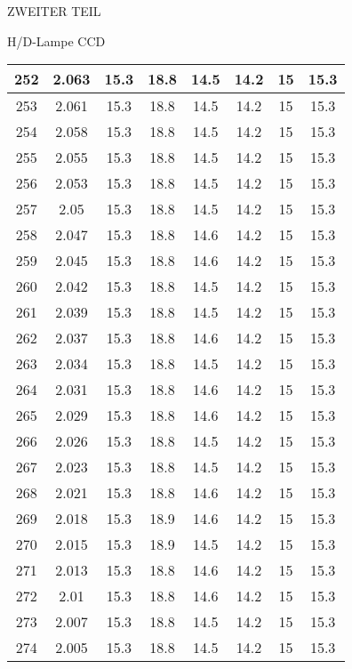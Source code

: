 \begin{appendix}
\begin{chapter}{ZWEITER TEIL}
\begin{section}{H/D-Lampe CCD}
\begin{scriptsize}
\begin{longtable}[htbp]{|c|c|c|c|c|c|c|c|}
            252 & 2.063 & 15.3 & 18.8 & 14.5 & 14.2 & 15 & 15.3 \\ \hline
            253 & 2.061 & 15.3 & 18.8 & 14.5 & 14.2 & 15 & 15.3 \\ \hline
            254 & 2.058 & 15.3 & 18.8 & 14.5 & 14.2 & 15 & 15.3 \\ \hline
            255 & 2.055 & 15.3 & 18.8 & 14.5 & 14.2 & 15 & 15.3 \\ \hline
            256 & 2.053 & 15.3 & 18.8 & 14.5 & 14.2 & 15 & 15.3 \\ \hline
            257 & 2.05 & 15.3 & 18.8 & 14.5 & 14.2 & 15 & 15.3 \\ \hline
            258 & 2.047 & 15.3 & 18.8 & 14.6 & 14.2 & 15 & 15.3 \\ \hline
            259 & 2.045 & 15.3 & 18.8 & 14.6 & 14.2 & 15 & 15.3 \\ \hline
            260 & 2.042 & 15.3 & 18.8 & 14.5 & 14.2 & 15 & 15.3 \\ \hline
            261 & 2.039 & 15.3 & 18.8 & 14.5 & 14.2 & 15 & 15.3 \\ \hline
            262 & 2.037 & 15.3 & 18.8 & 14.6 & 14.2 & 15 & 15.3 \\ \hline
            263 & 2.034 & 15.3 & 18.8 & 14.5 & 14.2 & 15 & 15.3 \\ \hline
            264 & 2.031 & 15.3 & 18.8 & 14.6 & 14.2 & 15 & 15.3 \\ \hline
            265 & 2.029 & 15.3 & 18.8 & 14.6 & 14.2 & 15 & 15.3 \\ \hline
            266 & 2.026 & 15.3 & 18.8 & 14.5 & 14.2 & 15 & 15.3 \\ \hline
            267 & 2.023 & 15.3 & 18.8 & 14.5 & 14.2 & 15 & 15.3 \\ \hline
            268 & 2.021 & 15.3 & 18.8 & 14.6 & 14.2 & 15 & 15.3 \\ \hline
            269 & 2.018 & 15.3 & 18.9 & 14.6 & 14.2 & 15 & 15.3 \\ \hline
            270 & 2.015 & 15.3 & 18.9 & 14.5 & 14.2 & 15 & 15.3 \\ \hline
            271 & 2.013 & 15.3 & 18.8 & 14.6 & 14.2 & 15 & 15.3 \\ \hline
            272 & 2.01 & 15.3 & 18.8 & 14.6 & 14.2 & 15 & 15.3 \\ \hline
            273 & 2.007 & 15.3 & 18.8 & 14.5 & 14.2 & 15 & 15.3 \\ \hline
            274 & 2.005 & 15.3 & 18.8 & 14.5 & 14.2 & 15 & 15.3 \\ \hline

\end{longtable}
\end{scriptsize}
\end{section}
\end{chapter}
\end{appendix}
